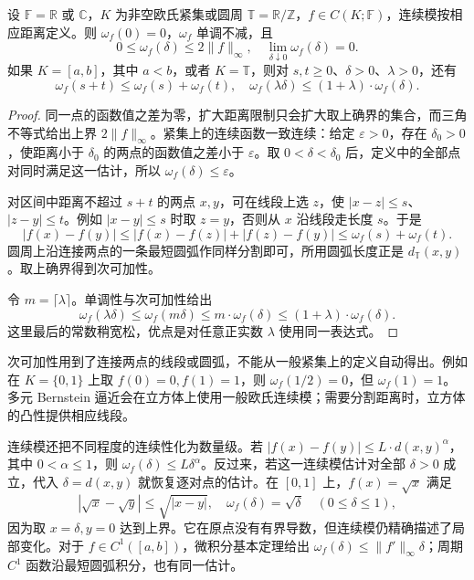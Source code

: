 \begin{proposition}
\label{b2:prop:approximation-modulus-properties}
设 \(\mathbb F=\mathbb R\) 或 \(\mathbb C\)，\(K\) 为非空欧氏紧集或圆周 \(\mathbb T=\mathbb R/\mathbb Z\)，\(f\in C(K;\mathbb F)\)，连续模按相应距离定义。则 \(\omega_f(0)=0\)，\(\omega_f\) 单调不减，且
\[
 0\leq\omega_f(\delta)\leq2\lVert f\rVert_\infty,
 \quad \lim_{\delta\downarrow0}\omega_f(\delta)=0.
\]
如果 \(K=[a,b]\)，其中 \(a<b\)，或者 \(K=\mathbb T\)，则对 \(s,t\geq0\)、\(\delta>0\)、\(\lambda>0\)，还有
\[
 \omega_f(s+t)\leq\omega_f(s)+\omega_f(t),
 \quad
 \omega_f(\lambda\delta)\leq(1+\lambda)\cdot\omega_f(\delta).
\]
\end{proposition}
\begin{proof}
同一点的函数值之差为零，扩大距离限制只会扩大取上确界的集合，而三角不等式给出上界 \(2\lVert f\rVert_\infty\)。紧集上的连续函数一致连续：给定 \(\varepsilon>0\)，存在 \(\delta_0>0\)，使距离小于 \(\delta_0\) 的两点的函数值之差小于 \(\varepsilon\)。取 \(0<\delta<\delta_0\) 后，定义中的全部点对同时满足这一估计，所以 \(\omega_f(\delta)\leq\varepsilon\)。

对区间中距离不超过 \(s+t\) 的两点 \(x,y\)，可在线段上选 \(z\)，使 \(|x-z|\leq s\)、\(|z-y|\leq t\)。例如 \(|x-y|\leq s\) 时取 \(z=y\)，否则从 \(x\) 沿线段走长度 \(s\)。于是
\[
 |f(x)-f(y)|\leq|f(x)-f(z)|+|f(z)-f(y)|
 \leq\omega_f(s)+\omega_f(t).
\]
圆周上沿连接两点的一条最短圆弧作同样分割即可，所用圆弧长度正是 \(d_{\mathbb T}(x,y)\)。取上确界得到次可加性。

令 \(m=\lceil\lambda\rceil\)。单调性与次可加性给出
\[
 \omega_f(\lambda\delta)\leq\omega_f(m\delta)
 \leq m\cdot\omega_f(\delta)
 \leq(1+\lambda)\cdot\omega_f(\delta).
\]
这里最后的常数稍宽松，优点是对任意正实数 \(\lambda\) 使用同一表达式。
\end{proof}

次可加性用到了连接两点的线段或圆弧，不能从一般紧集上的定义自动得出。例如在 \(K=\{0,1\}\) 上取 \(f(0)=0,f(1)=1\)，则 \(\omega_f(1/2)=0\)，但 \(\omega_f(1)=1\)。多元 Bernstein 逼近会在立方体上使用一般欧氏连续模；需要分割距离时，立方体的凸性提供相应线段。

\ProseParagraphBreak
连续模还把不同程度的连续性化为数量级。若 \(|f(x)-f(y)|\leq L\cdot d(x,y)^\alpha\)，其中 \(0<\alpha\leq1\)，则 \(\omega_f(\delta)\leq L\delta^\alpha\)。反过来，若这一连续模估计对全部 \(\delta>0\) 成立，代入 \(\delta=d(x,y)\) 就恢复逐对点的估计。在 \([0,1]\) 上，\(f(x)=\sqrt x\) 满足
\[
 |\sqrt x-\sqrt y|\leq\sqrt{|x-y|},
 \quad \omega_f(\delta)=\sqrt\delta\quad(0\leq\delta\leq1),
\]
因为取 \(x=\delta,y=0\) 达到上界。它在原点没有有界导数，但连续模仍精确描述了局部变化。对于 \(f\in C^1([a,b])\)，微积分基本定理给出 \(\omega_f(\delta)\leq\lVert f'\rVert_\infty\delta\)；周期 \(C^1\) 函数沿最短圆弧积分，也有同一估计。

